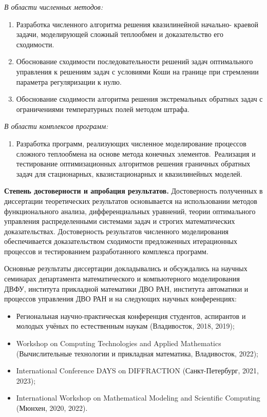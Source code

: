     \textit{В области численных методов:}

    \begin{enumerate}[leftmargin=5.5mm]
        \setcounter{enumi}{\value{nameOfYourChoice}}
        \item Разработка численного алгоритма решения квазилинейной начально-
        краевой задачи, моделирующей сложный теплообмен и доказательство его
        сходимости.
        \item Обоснование сходимости последовательности решений задач
        оптимального управления к решениям задач с условиями Коши на границе
        при стремлении параметра регуляризации к нулю.
        \item Обоснование сходимости алгоритма решения экстремальных обратных
        задач с ограничениями температурных полей методом штрафа.
        \setcounter{nameOfYourChoice}{\value{enumi}}
    \end{enumerate}

    \textit{В области комплексов программ:}

    \begin{enumerate}[leftmargin=5.5mm]
        \setcounter{enumi}{\value{nameOfYourChoice}}
        \item Разработка программ, реализующих численное моделирование процессов
        сложного теплообмена на основе метода конечных элементов.\ Реализация и
        тестирование оптимизационных алгоритмов решения граничных обратных
        задач для стационарных, квазистационарных и квазилинейных моделей.
    \end{enumerate}


    \textbf{Степень достоверности и апробация результатов.}
    Достоверность полученных в диссертации теоретических результатов основывается на
    использовании методов функционального анализа, дифференциальных
    уравнений, теории оптимального управления распределенными системами
    задач и строгих математических доказательствах.
    Достоверность результатов численного моделирования обеспечивается
    доказательством сходимости предложенных итерационных процессов
    и тестированием разработанного комплекса программ.

    Основные результаты диссертации докладывались и обсуждались на
    научных семинарах департамента математического и компьютерного моделирования
    ДВФУ, института прикладной математики ДВО РАН, института автоматики
    и процессов управления ДВО РАН и на следующих научных конференциях:
    \begin{itemize}[leftmargin=5.5mm]
        \item Региональная научно-практическая конференция студентов, аспирантов
        и молодых учёных по естественным наукам (Владивосток, 2018, 2019);
        \item Workshop on Computing Technologies and Applied Mathematics
        (Вычислительные технологии и прикладная математика, Владивосток, 2022);
        \item International Conference DAYS on DIFFRACTION (Санкт-Петербург, 2021, 2023);
        \item International Workshop on Mathematical Modeling and Scientific Computing (Мюнхен, 2020, 2022).
    \end{itemize}

